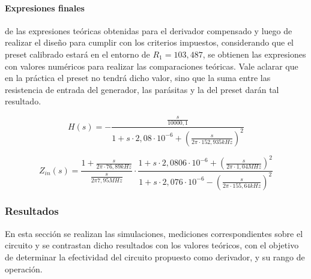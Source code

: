 \paragraph*{Expresiones finales} de las expresiones te\'oricas obtenidas para el derivador compensado y luego de realizar el dise\~no para cumplir con los criterios impuestos, considerando que el preset calibrado estar\'a en el entorno de $R_1 = 103,487$, se obtienen las expresiones con valores num\'ericos para realizar las comparaciones te\'oricas. Vale aclarar que en la pr\'actica el preset no tendr\'a dicho valor, sino que la suma entre las resistencia de entrada del generador, las par\'asitas y la del preset dar\'an tal resultado.

\begin{equation}
	H(s) = - \frac{\frac{s}{10000,1}}{1 + s \cdot 2,08 \cdot 10^{-6} + \left( \frac{s}{2\pi \cdot 152,935 kHz}\right)^{2}}
\end{equation}

\begin{equation}
	Z_{in}(s) = \frac{1 + \frac{s}{2\pi \cdot 76,89kHz}}{\frac{s}{2\pi 7,95MHz}} \cdot 
	\frac{1 + s \cdot 2,0806 \cdot 10 ^{-6} + \left( \frac{s}{2\pi \cdot 1,04MHz} \right)^{2}}{1 + s \cdot 2,076 \cdot 10^{-6} - \left( \frac{s}{2 \pi \cdot 155,64kHz} \right)^{2}}
\end{equation}

\subsubsection{Resultados}
En esta secci\'on se realizan las simulaciones, mediciones correspondientes sobre el circuito y se contrastan dicho resultados
con los valores te\'oricos, con el objetivo de determinar la efectividad del circuito propuesto como derivador, y su rango de operaci\'on.


